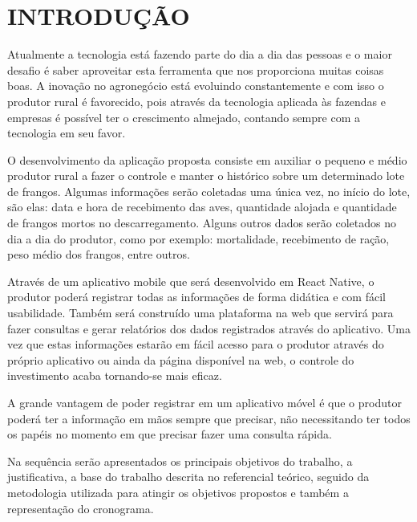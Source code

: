 
\chapter{INTRODUÇÃO}
\label{chap:introducao}




Atualmente a tecnologia está fazendo parte do dia a dia das pessoas e o maior desafio é saber aproveitar esta ferramenta que nos proporciona muitas coisas boas. A inovação no agronegócio está evoluindo constantemente e com isso o produtor rural é favorecido, pois através da tecnologia aplicada às fazendas e empresas é possível ter o crescimento almejado, contando sempre com a tecnologia em seu favor.

O desenvolvimento da aplicação proposta consiste em auxiliar o pequeno e médio produtor rural a fazer o controle e manter o histórico sobre um determinado lote de frangos. Algumas informações serão coletadas uma única vez, no início do lote, são elas: data e hora de recebimento das aves, quantidade alojada e quantidade de frangos mortos no descarregamento. Alguns outros dados serão coletados no dia a dia do produtor, como por exemplo: mortalidade, recebimento de ração, peso médio dos frangos, entre outros.

Através de um aplicativo mobile que será desenvolvido em React Native, o produtor poderá registrar todas as informações de forma didática e com fácil usabilidade. Também será construído uma plataforma na web que servirá para fazer consultas e gerar relatórios dos dados registrados através do aplicativo.
Uma vez que estas informações estarão em fácil acesso para o produtor através do próprio aplicativo ou ainda da página disponível na web, o controle do investimento acaba tornando-se mais eficaz.


A grande vantagem de poder registrar em um aplicativo móvel é que o produtor poderá ter a informação em mãos sempre que precisar, não necessitando ter todos os papéis no momento em que precisar fazer uma consulta rápida.

Na sequência serão apresentados os principais objetivos do trabalho, a justificativa, a base do trabalho descrita no referencial teórico, seguido da metodologia utilizada para atingir os objetivos propostos e também a representação do cronograma.